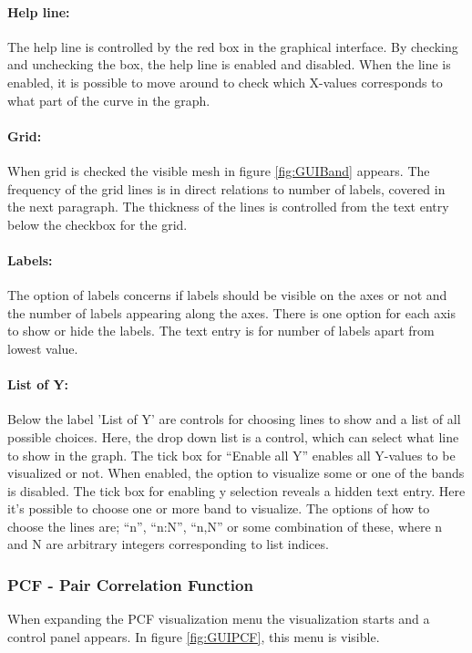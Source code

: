 \paragraph{Help line: }
The help line is controlled by the red box in the graphical interface. By checking and unchecking the box, the help line is enabled and disabled. When the line is enabled, it is possible to move around to check which X-values corresponds to what part of the curve in the graph.
\paragraph{Grid: }
When grid is checked the visible mesh in figure \ref{fig:GUIBand} appears. The frequency of the grid lines is in direct relations to number of labels, covered in the next paragraph. The thickness of the lines is controlled from the text entry below the checkbox for the grid.
\paragraph{Labels: }
The option of labels concerns if labels should be visible on the axes or not and the number of labels appearing along the axes. There is one option for each axis to show or hide the labels. The text entry is for number of labels apart from lowest value.
\paragraph{List of Y: }
Below the label 'List of Y' are controls for choosing lines to show and a list of all possible choices. Here, the drop down list is a control, which can select what line to show in the graph. The tick box for ``Enable all Y'' enables all Y-values to be visualized or not. When enabled, the option to visualize some or one of the bands is disabled. 
The tick box for enabling y selection reveals a hidden text entry. Here it's possible to choose one or more band to visualize. The options of how to choose the lines are; ``n'', ``n:N'', ``n,N'' or some combination of these, where n and N are arbitrary integers corresponding to list indices.

\subsubsection{PCF - Pair Correlation Function}
When expanding the PCF visualization menu the visualization starts and a control panel appears. In figure \ref{fig:GUIPCF}, this menu is visible.

